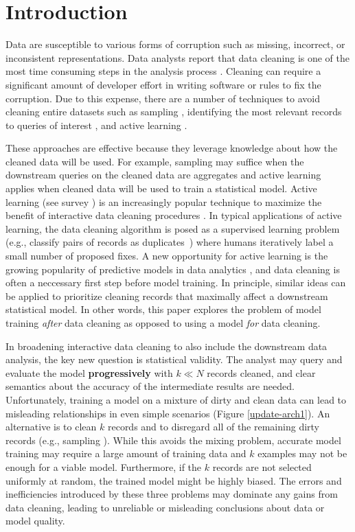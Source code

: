 \section{Introduction}
Data are susceptible to various forms of corruption such as missing, incorrect, or inconsistent representations.
Data analysts report that data cleaning is one of the most time consuming steps in the analysis process \cite{nytimes}.
Cleaning can require a significant amount of developer effort in writing software or rules to fix the corruption.
Due to this expense, there are a number of techniques to avoid cleaning entire datasets such as sampling \cite{wang1999sample}, identifying the most relevant records to queries of interest \cite{DBLP:conf/sigmod/BergmanMNT15}, and active learning \cite{gokhale2014corleone}.

These approaches are effective because they leverage knowledge about how the cleaned data will be used. 
For example, sampling may suffice when the downstream queries on the cleaned data are aggregates and active learning applies when cleaned data will be used to train a statistical model.
Active learning (see survey \cite{settles2010active}) is an increasingly popular technique to maximize the benefit of interactive data cleaning procedures \cite{DBLP:journals/pvldb/YakoutENOI11, gokhale2014corleone, yakout2013don, DBLP:journals/pvldb/HaasKWF015}.
In typical applications of active learning, the data cleaning algorithm is posed as a supervised learning problem (e.g., classify pairs of records as duplicates~\cite{gokhale2014corleone}) where humans iteratively label a small number of proposed fixes.
A new opportunity for active learning is the growing popularity of predictive models in data analytics \cite{bdas, alexandrov2014stratosphere, crotty2014tupleware, hellerstein2012madlib}, and data cleaning is often a neccessary first step before model training.
In principle, similar ideas can be applied to prioritize cleaning records that maximally affect a downstream statistical model.
In other words, this paper explores the problem of model training \emph{after} data cleaning as opposed to using a model \emph{for} data cleaning.

In broadening interactive data cleaning to also include the downstream data analysis, the key new question is statistical validity.
The analyst may query and evaluate the model \textbf{progressively} with $k \ll N$ records cleaned, and clear semantics about the accuracy of the intermediate results are needed.
Unfortunately, training a model on a mixture of dirty and clean data can lead to misleading relationships in even simple scenarios (Figure \ref{update-arch1}).
An alternative is to clean $k$ records and to disregard all of the remaining dirty records (e.g., sampling \cite{wang1999sample}).
While this avoids the mixing problem, accurate model training may require a large amount of training data and $k$ examples may not be enough for a viable model.
Furthermore, if the $k$ records are not selected uniformly at random, the trained model might be highly biased.
The errors and inefficiencies introduced by these three problems may dominate any gains from data cleaning, leading to unreliable or misleading conclusions about data or model quality.

